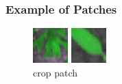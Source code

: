 \documentclass{beamer}
\begin{document}
\begin{frame}
\frametitle{Example of Patches}

\begin{figure}[!htb]
  \includegraphics[width=\linewidth]{crop.png}
  \caption{crop patch}\label{fig:crop sample}
\endminipage\hfill
{}
  \includegraphics[width=\linewidth]{weed.png}

\end{figure}
\end{frame}
\end{document}

